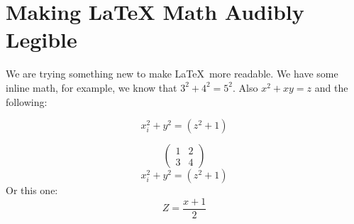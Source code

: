 \documentclass{article}
\newcommand{\mymat}[1]{\begin{pmatrix} #1 \end{pmatrix}}
\begin{document}
\section{Making \LaTeX{} Math Audibly Legible}

We are trying something new to make \LaTeX\ more readable. We have some inline math, for example, we know that $3^2 + 4^2 = 5^{2}$. Also \(x^2 + xy = z\) and the following:

\begin{equation}
       x_i^2 + y^2 = (z^2 + 1)
    \end{equation}

    \begin{equation*}
        \mymat{ 1 & 2 \\ 3 & 4 }
     \end{equation*} 
\begin{equation}
    x_i^2 + y^2 = (z^2 + 1)
 \end{equation}
Or this one:
    \[
       Z = \frac{x+1}{2}
    \]
\end{document}
